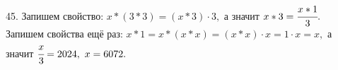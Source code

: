 45. Запишем свойство: $x*(3*3)=(x*3)\cdot3,$ а значит $x*3=\cfrac{x*1}{3}.$ Запишем свойства ещё раз: $x*1=x*(x*x)=(x*x)\cdot x=1\cdot x=x,$ а значит
$\cfrac{x}{3}=2024,\ x=6072.$
\newpage
